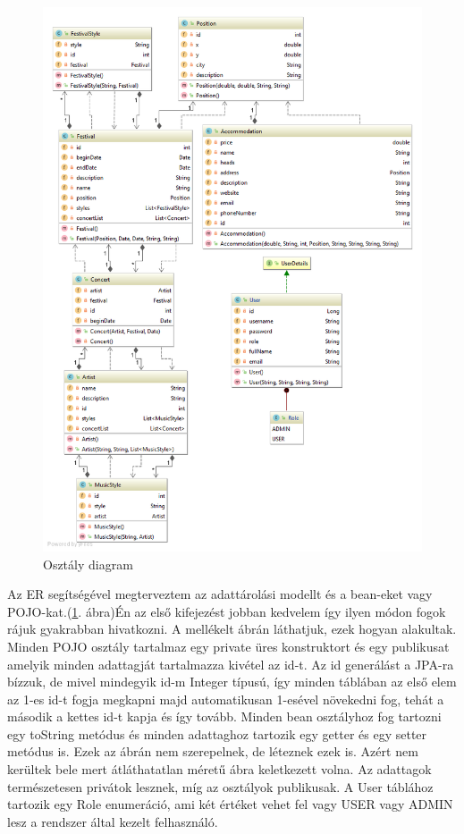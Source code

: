 \begin{figure}
\centering
\includegraphics[scale=0.56]{kepek/uml.png}
\caption{Osztály diagram}
\label{fig:umlclass}
\end{figure}

Az ER segítségével megterveztem az adattárolási modellt és a bean-eket vagy POJO-kat.(\ref{fig:umlclass}. ábra)Én az első kifejezést jobban kedvelem így ilyen módon fogok rájuk gyakrabban hivatkozni. A mellékelt ábrán láthatjuk, ezek hogyan alakultak. Minden POJO osztály tartalmaz egy private üres konstruktort és egy publikusat amelyik minden adattagját tartalmazza kivétel az id-t. Az id generálást a JPA-ra bízzuk, de mivel mindegyik id-m Integer típusú, így minden táblában az első elem az 1-es id-t fogja megkapni majd automatikusan 1-esével növekedni fog, tehát a második a kettes id-t kapja és így tovább. Minden bean osztályhoz fog tartozni egy toString metódus és minden adattaghoz tartozik egy getter és egy setter metódus is.  Ezek az ábrán nem szerepelnek, de léteznek ezek is. Azért nem kerültek bele mert átláthatatlan méretű ábra keletkezett volna. Az adattagok természetesen privátok lesznek, míg az osztályok publikusak. A User táblához tartozik egy Role enumeráció, ami két értéket vehet fel vagy USER vagy ADMIN lesz a rendszer által kezelt felhasználó.

